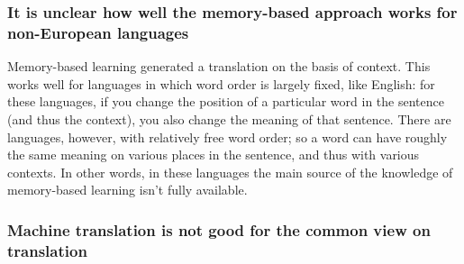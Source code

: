 \documentclass[12pt]{article}
\begin{document}
\subsubsection{It is unclear how well the memory-based approach works for non-European languages}

Memory-based learning generated a translation on the basis of context. This works well for languages in which word order is largely fixed, like English: for these languages, if you change the position of a particular word in the sentence (and thus the context), you also change the meaning of that sentence. There are languages, however, with relatively free word order; so a word can have roughly the same meaning on various places in the sentence, and thus with various contexts. In other words, in these languages the main source of the knowledge of memory-based learning isn't fully available.


\subsubsection{Machine translation is not good for the common view on translation}
\end{document}

